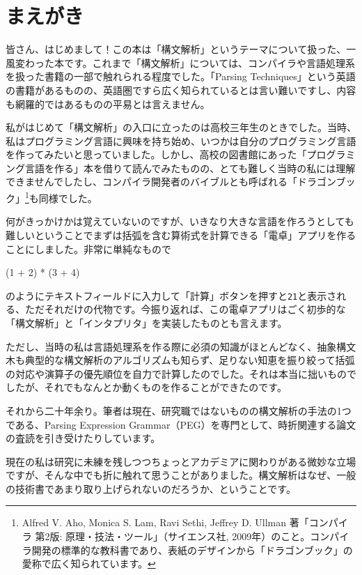 \chapter*{まえがき}\label{maegaki}

皆さん、はじめまして！この本は「構文解析」というテーマについて扱った、一風変わった本です。これまで「構文解析」については、コンパイラや言語処理系を扱った書籍の一部で触れられる程度でした。「Parsing
Techniques」という英語の書籍があるものの、英語圏ですら広く知られているとは言い難いですし、内容も網羅的ではあるものの平易とは言えません。

私がはじめて「構文解析」の入口に立ったのは高校三年生のときでした。当時、私はプログラミング言語に興味を持ち始め、いつかは自分のプログラミング言語を作ってみたいと思っていました。しかし、高校の図書館にあった「プログラミング言語を作る」本を借りて読んでみたものの、とても難しく当時の私には理解できませんでしたし、コンパイラ開発者のバイブルとも呼ばれる「ドラゴンブック」\footnote{Alfred
  V. Aho, Monica S. Lam, Ravi Sethi, Jeffrey D. Ullman 著「コンパイラ
  第2版: 原理・技法・ツール」（サイエンス社,
  2009年）のこと。コンパイラ開発の標準的な教科書であり、表紙のデザインから「ドラゴンブック」の愛称で広く知られています。}も同様でした。

何がきっかけかは覚えていないのですが、いきなり大きな言語を作ろうとしても難しいということでまずは括弧を含む算術式を計算できる「電卓」アプリを作ることにしました。非常に単純なもので

\begin{codescreen}{}
(1 + 2) * (3 + 4)
\end{codescreen}

\noindent のようにテキストフィールドに入力して「計算」ボタンを押すと\texttt{21}と表示される、ただそれだけの代物です。今振り返れば、この電卓アプリはごく初歩的な「構文解析」と「インタプリタ」を実装したものとも言えます。

ただし、当時の私は言語処理系を作る際に必須の知識がほとんどなく、抽象構文木も典型的な構文解析のアルゴリズムも知らず、足りない知恵を振り絞って括弧の対応や演算子の優先順位を自力で計算したのでした。それは本当に拙いものでしたが、それでもなんとか動くものを作ることができたのです。

それから二十年余り。筆者は現在、研究職ではないものの構文解析の手法の1つである、Parsing
Expression
Grammar（PEG）を専門として、時折関連する論文の査読を引き受けたりしています。

現在の私は研究に未練を残しつつちょっとアカデミアに関わりがある微妙な立場ですが、そんな中でも折に触れて思うことがありました。構文解析はなぜ、一般の技術書であまり取り上げられないのだろうか、ということです。

